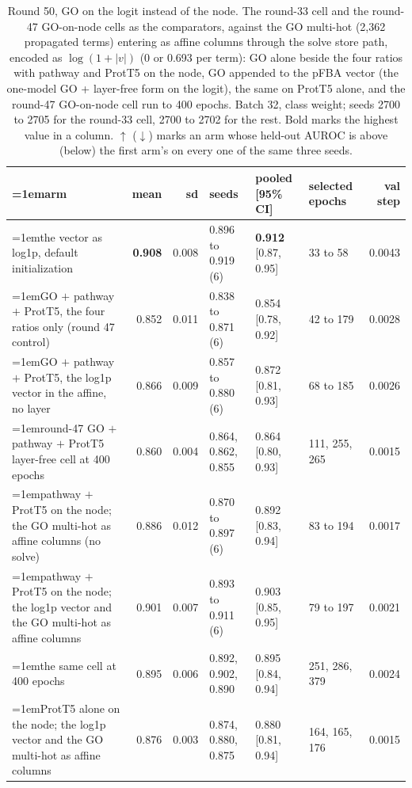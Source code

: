 \begin{table}[H]
  \centering
  \scriptsize
  \setlength{\tabcolsep}{2.5pt}
  \caption[Round 50, GO on the logit instead of the node]{Round 50, GO on the logit instead of the node. The round-33 cell and the round-47 GO-on-node cells as the comparators, against the GO multi-hot (2,362 propagated terms) entering as affine columns through the solve store path, encoded as $\log(1 + |v|)$ (0 or 0.693 per term): GO alone beside the four ratios with pathway and ProtT5 on the node, GO appended to the pFBA vector (the one-model GO + layer-free form on the logit), the same on ProtT5 alone, and the round-47 GO-on-node cell run to 400 epochs. Batch 32, class weight; seeds 2700 to 2705 for the round-33 cell, 2700 to 2702 for the rest. Bold marks the highest value in a column. $\uparrow$ ($\downarrow$) marks an arm whose held-out AUROC is above (below) the first arm's on every one of the same three seeds.}
  \label{tab:w66}
  \begin{tabular}{@{}>{\raggedright\hangindent=1em\hangafter=1\arraybackslash}p{83.4mm}rrlllr@{}}
    \hline
    arm & mean & sd & seeds & pooled [95\% CI] & selected epochs & val step \\
    \hline
    the vector as log1p, default initialization & \textbf{0.908} & 0.008 & 0.896 to 0.919 (6) & \textbf{0.912} [0.87, 0.95] & 33 to 58 & 0.0043 \\
    GO $+$ pathway $+$ ProtT5, the four ratios only (round 47 control) & 0.852 & 0.011 & 0.838 to 0.871 (6) & 0.854 [0.78, 0.92] & 42 to 179 & 0.0028 \\
    GO $+$ pathway $+$ ProtT5, the log1p vector in the affine, no layer & 0.866 & 0.009 & 0.857 to 0.880 (6) & 0.872 [0.81, 0.93] & 68 to 185 & 0.0026 \\
    round-47 GO $+$ pathway $+$ ProtT5 layer-free cell at 400 epochs & 0.860 & 0.004 & 0.864, 0.862, 0.855 & 0.864 [0.80, 0.93] & 111, 255, 265 & 0.0015 \\
    pathway $+$ ProtT5 on the node; the GO multi-hot as affine columns (no solve) & 0.886 & 0.012 & 0.870 to 0.897 (6) & 0.892 [0.83, 0.94] & 83 to 194 & 0.0017 \\
    pathway $+$ ProtT5 on the node; the log1p vector and the GO multi-hot as affine columns & 0.901 & 0.007 & 0.893 to 0.911 (6) & 0.903 [0.85, 0.95] & 79 to 197 & 0.0021 \\
    the same cell at 400 epochs & 0.895 & 0.006 & 0.892, 0.902, 0.890 & 0.895 [0.84, 0.94] & 251, 286, 379 & 0.0024 \\
    ProtT5 alone on the node; the log1p vector and the GO multi-hot as affine columns & 0.876 & 0.003 & 0.874, 0.880, 0.875 & 0.880 [0.81, 0.94] & 164, 165, 176 & 0.0015 \\
    \hline
  \end{tabular}
\end{table}
